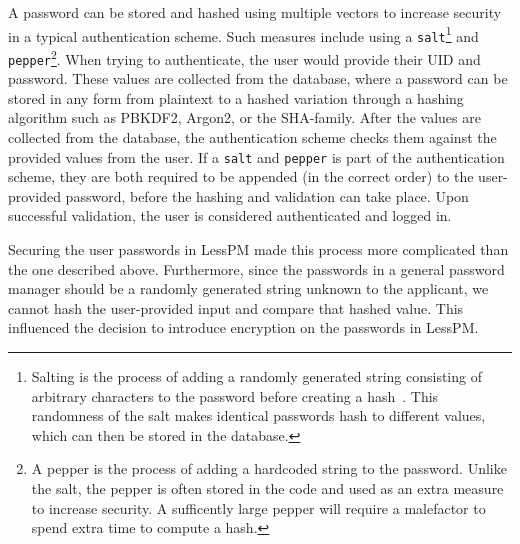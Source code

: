 A password can be stored and hashed using multiple vectors to increase
security in a typical authentication scheme.
Such measures include using a \texttt{salt}\footnote{
  Salting is the process of adding a randomly generated string consisting of
  arbitrary characters to the password before creating a hash~\cite{Kharod2015}.
  This randomness of the salt makes identical passwords hash to different
  values, which can then be stored in the database.
} and \texttt{pepper}\footnote{
  A pepper is the process of adding a hardcoded string to the password.
  Unlike the salt, the pepper is often stored in the code and used as an
  extra measure to increase security.
  A sufficently large pepper will require a malefactor to spend extra time to
  compute a hash.
}.
When trying to authenticate, the user would provide their UID and password.
These values are collected from the database, where a password can be stored in
any form from plaintext to a hashed variation through a hashing algorithm
such as PBKDF2, Argon2, or the SHA-family.
After the values are collected from the database, the authentication scheme
checks them against the provided values from the user.
If a \texttt{salt} and \texttt{pepper} is part of the authentication scheme,
they are both required to be appended (in the correct order) to the
user-provided password, before the hashing and validation can take place.
Upon successful validation, the user is considered authenticated and logged in.

Securing the user passwords in LessPM made this process more complicated than
the one described above.
Furthermore, since the passwords in a general password manager should be a
randomly generated string unknown to the applicant, we cannot hash the
user-provided input and compare that hashed value.
This influenced the decision to introduce encryption on the passwords in
LessPM\@.

